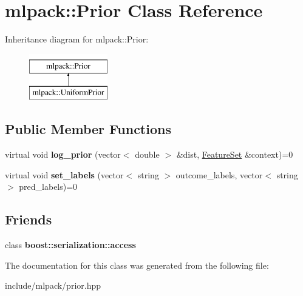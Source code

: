 \hypertarget{classmlpack_1_1_prior}{
\section{mlpack::Prior Class Reference}
\label{classmlpack_1_1_prior}
}
Inheritance diagram for mlpack::Prior:\begin{figure}[H]
\begin{center}
\leavevmode
\includegraphics[height=2.000000cm]{classmlpack_1_1_prior}
\end{center}
\end{figure}
\subsection*{Public Member Functions}
\begin{DoxyCompactItemize}
\item 
\hypertarget{classmlpack_1_1_prior_a77157f8dde683313d7a0872e5f4204f1}{
virtual void {\bfseries log\_\-prior} (vector$<$ double $>$ \&dist, \hyperlink{structmlpack_1_1_feature_set}{FeatureSet} \&context)=0}
\label{classmlpack_1_1_prior_a77157f8dde683313d7a0872e5f4204f1}

\item 
\hypertarget{classmlpack_1_1_prior_a3e1b4e2bcc76dd9a5cfb213dedca9e5f}{
virtual void {\bfseries set\_\-labels} (vector$<$ string $>$ outcome\_\-labels, vector$<$ string $>$ pred\_\-labels)=0}
\label{classmlpack_1_1_prior_a3e1b4e2bcc76dd9a5cfb213dedca9e5f}

\end{DoxyCompactItemize}
\subsection*{Friends}
\begin{DoxyCompactItemize}
\item 
\hypertarget{classmlpack_1_1_prior_ac98d07dd8f7b70e16ccb9a01abf56b9c}{
class {\bfseries boost::serialization::access}}
\label{classmlpack_1_1_prior_ac98d07dd8f7b70e16ccb9a01abf56b9c}

\end{DoxyCompactItemize}


The documentation for this class was generated from the following file:\begin{DoxyCompactItemize}
\item 
include/mlpack/prior.hpp\end{DoxyCompactItemize}
